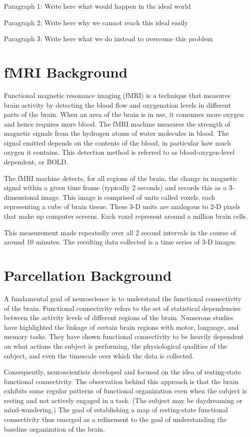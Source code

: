 Paragraph 1: Write here what would happen in the ideal world

Paragraph 2: Write here why we cannot reach this ideal easily

Paragraph 3: Write here what we do instead to overcome this problem

\section{fMRI Background}

Functional magnetic resonance imaging (fMRI) is a technique that
measures brain activity by detecting the blood flow and oxygenation
levels in different parts of the brain. When an area of the brain
is in use, it consumes more oxygen and hence requires more blood.
The fMRI machine measures the strength of magnetic signals from the
hydrogen atoms of water molecules in blood. The signal emitted depends
on the contents of the blood, in particular how much oxygen it contains. 
This detection method is referred to as blood-oxygen-level dependent, or
BOLD.

The fMRI machine detects, for all regions of the brain, the change in
magnetic signal within a given time frame (typically 2 seconds) and
records this as a 3-dimensional image. This image is comprised of units
called voxels, each representing a cube of brain tissue. These 3-D units
are analogous to 2-D pixels that make up computer screens. Each voxel
represent around a million brain cells.

This measurement made repeatedly over all 2 second intervals in the
course of around 10 minutes. The resulting data collected is a time
series of 3-D images.

\section{Parcellation Background}

A fundamental goal of neuroscience is to understand the functional
connectivity of the brain. Functional connectivity refers to the set
of statistical dependencies between the activity levels of different
regions of the brain. Numerous studies have highlighted the linkage of
certain brain regions with motor, language, and memory tasks. They
have shown functional connectivity to be heavily dependent on what
actions the subject is performing, the physiological qualities of the
subject, and even the timescale over which the data is collected.

Consequently, neuroscientists developed and focused on the idea of
resting-state functional connectivity. The observation behind this
approach is that the brain exhibits some regular patterns of functional
organization even when the subject is resting and not actively engaged
in a task. (The subject may be daydreaming or mind-wandering.) The goal
of establishing a map of resting-state functional connectivity thus
emerged as a refinement to the goal of understanding the baseline
organization of the brain.


